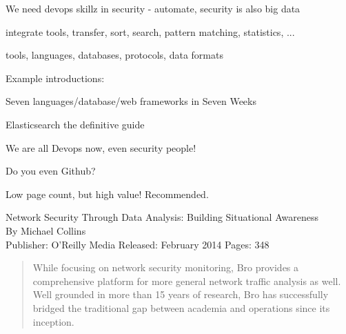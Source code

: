 \documentclass[20pt,landscape,a4paper,footrule]{foils}
\begin{document}

\begin{list1}
\item We need devops skillz in security - automate, security is also big data
\item integrate tools, transfer, sort, search, pattern matching, statistics, ...
\item tools, languages, databases, protocols, data formats
\item Example introductions:
\begin{list2}
\item Seven languages/database/web frameworks in Seven Weeks
\item Elasticsearch the definitive guide\\
\item {}
\item {}
\end{list2}
\end{list1}

\centerline{We are all Devops now, even security people!}

Do you even Github? \smiley {}



Low page count, but high value! Recommended.

Network Security Through Data Analysis: Building Situational Awareness\\
By Michael Collins\\
Publisher: O'Reilly Media
Released: February 2014 Pages: 348





\begin{quote}
While focusing on network security monitoring, Bro provides a comprehensive platform for more general network traffic analysis as well. Well grounded in more than 15 years of research, Bro has successfully bridged the traditional gap between academia and operations since its inception.
\end{quote}

\end{document}
